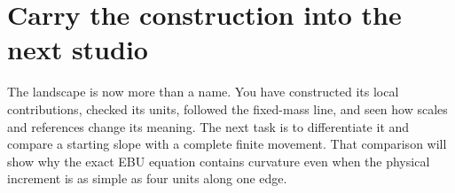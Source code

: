 \section{Carry the construction into the next studio}

The landscape is now more than a name. You have constructed its local contributions, checked its units, followed the fixed-mass line, and seen how scales and references change its meaning. The next task is to differentiate it and compare a starting slope with a complete finite movement. That comparison will show why the exact EBU equation contains curvature even when the physical increment is as simple as four units along one edge.
